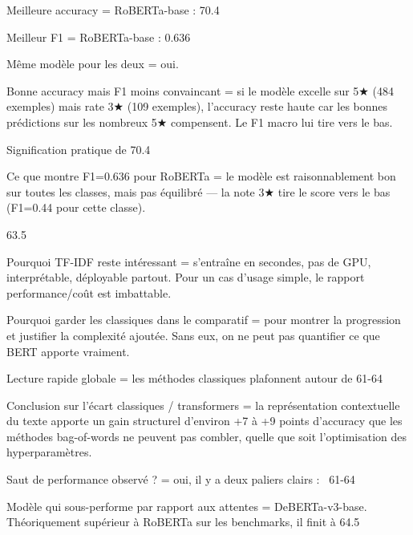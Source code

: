 Meilleure accuracy = RoBERTa-base : 70.4%

Meilleur F1 = RoBERTa-base : 0.636

Même modèle pour les deux = oui.

Bonne accuracy mais F1 moins convaincant = si le modèle excelle sur 5★ (484 exemples) mais rate 3★ (109 exemples), l'accuracy reste haute car les bonnes prédictions sur les nombreux 5★ compensent. Le F1 macro lui tire vers le bas.

Signification pratique de 70.4%

Ce que montre F1=0.636 pour RoBERTa = le modèle est raisonnablement bon sur toutes les classes, mais pas équilibré — la note 3★ tire le score vers le bas (F1=0.44 pour cette classe).

63.5%

Pourquoi TF-IDF reste intéressant = s'entraîne en secondes, pas de GPU, interprétable, déployable partout. Pour un cas d'usage simple, le rapport performance/coût est imbattable.

Pourquoi garder les classiques dans le comparatif = pour montrer la progression et justifier la complexité ajoutée. Sans eux, on ne peut pas quantifier ce que BERT apporte vraiment.

Lecture rapide globale = les méthodes classiques plafonnent autour de 61-64%

Conclusion sur l'écart classiques / transformers = la représentation contextuelle du texte apporte un gain structurel d'environ +7 à +9 points d'accuracy que les méthodes bag-of-words ne peuvent pas combler, quelle que soit l'optimisation des hyperparamètres.

Saut de performance observé ? = oui, il y a deux paliers clairs : ~61-64%

Modèle qui sous-performe par rapport aux attentes = DeBERTa-v3-base. Théoriquement supérieur à RoBERTa sur les benchmarks, il finit à 64.5%


